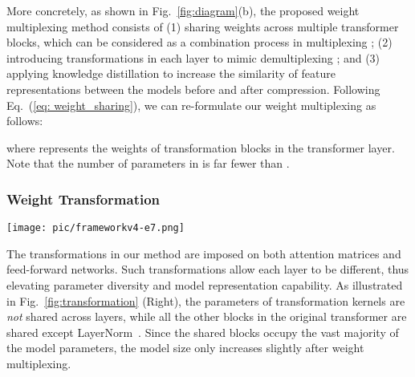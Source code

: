 \documentclass[10pt,twocolumn,letterpaper]{article}
\begin{document}
More concretely, as shown in Fig.~\ref{fig:diagram}(b),
the proposed weight multiplexing method consists of (1) sharing weights across multiple transformer blocks, which can be considered as a combination process in multiplexing \cite{cdm};  (2) introducing transformations in each layer to mimic demultiplexing \cite{cdm}; and (3) applying knowledge distillation to increase the similarity of feature representations between the models before and after compression. Following Eq.~(\ref{eq: weight_sharing}), we can re-formulate our weight multiplexing as follows:

where  represents the weights of transformation blocks in the  transformer layer. Note that the number of parameters in  is far fewer than .
    
\vspace{-2mm}
\subsubsection{Weight Transformation}
    \begin{figure*}[t]
        \vspace{-1.1cm}
        \hspace{-0.6cm}
        \centering
        \texttt{[image: pic/frameworkv4-e7.png]}
        \vspace{-1cm}
        \caption {\textbf{Left:} The overall framework of MiniViT. Note that the number of stages are configurable, instead of being fixed in Swin transformers~\cite{Swin}. The transformer layers in each stage of the original models to be compressed should have identical structures and dimension. \textbf{Right:} The detailed transformer block in a MiniViT. We share weights of MSA and MLP in each stage, and add two transformation blocks to increase the parameter diversity. The transformation blocks and normalization layers are not shared. 
        }
        \vspace{-5mm}
    
        \label {fig:transformation}
    \end{figure*}
    
    The transformations in our method are imposed on both attention matrices and feed-forward networks. Such transformations allow each layer to be different, thus elevating parameter diversity and model representation capability. As illustrated in Fig.~\ref{fig:transformation} (Right), the parameters of transformation kernels are \emph{not} shared across layers, while all the other blocks in the original transformer are shared except LayerNorm~\cite{LN}. Since the shared blocks occupy the vast majority of the model parameters,
    the model size only increases slightly after weight multiplexing.
\end{document}
